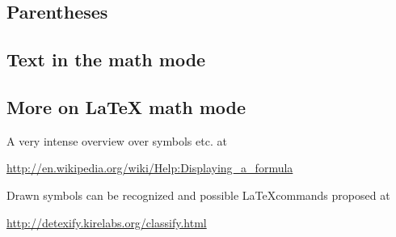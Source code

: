 \subsection{Parentheses}
\begin{frame}
\end{frame}


\subsection{Text in the math mode}
\begin{frame}
\end{frame}

\subsection{More on {\LaTeX} math mode}
\begin{frame}
	A very intense overview over symbols etc. at
	\begin{center}
		\url{http://en.wikipedia.org/wiki/Help:Displaying_a_formula}
	\end{center}
	Drawn symbols can be recognized and possible \LaTeX commands proposed at
	\begin{center}
		\url{http://detexify.kirelabs.org/classify.html}
	\end{center}
\end{frame}
